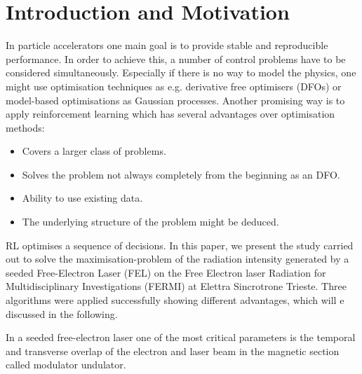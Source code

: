 \documentclass[
 reprint,
 amsmath,amssymb,amsfonts,clevref,
 aps,
prstab,
]{revtex4-2}
\begin{document}
\section{Introduction and Motivation}
In particle accelerators one main goal is to provide stable and reproducible performance. In order to achieve this, a number of control problems have to be considered simultaneously. Especially if there is no way to model the physics, one might use optimisation techniques as e.g. derivative free optimisers (DFOs) or model-based optimisations as Gaussian processes. Another promising way is to apply reinforcement learning which has several advantages over optimisation methods:
\begin{itemize}
    \item Covers a larger class of problems.
    \item Solves the problem not always completely from the beginning as an DFO.
    \item Ability to use existing data.
    \item The underlying structure of the problem might be deduced.
\end{itemize}
RL optimises a sequence of decisions. 
In this paper, we present the study carried out to solve the maximisation-problem of the radiation intensity generated by a seeded Free-Electron Laser (FEL) on the Free Electron laser Radiation for Multidisciplinary Investigations (FERMI) at Elettra Sincrotrone Trieste. Three algorithms were applied successfully showing different advantages, which will e discussed in the following.


In a seeded free-electron laser one of the most critical parameters is the temporal and transverse overlap of the electron and laser beam in the magnetic section called modulator undulator. 
\end{document}
